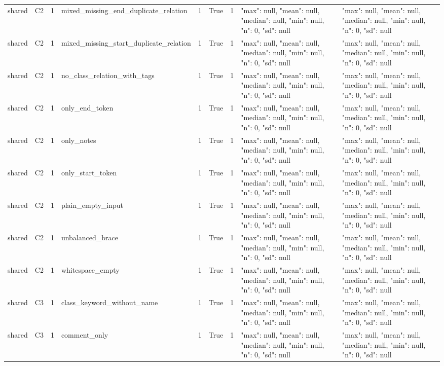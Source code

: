 \begin{tabular}{lllllllll}
shared & C2 & 1 & mixed\_missing\_end\_duplicate\_relation & 1 & True & 1 & {"max": null, "mean": null, "median": null, "min": null, "n": 0, "sd": null} & {"max": null, "mean": null, "median": null, "min": null, "n": 0, "sd": null} \\
shared & C2 & 1 & mixed\_missing\_start\_duplicate\_relation & 1 & True & 1 & {"max": null, "mean": null, "median": null, "min": null, "n": 0, "sd": null} & {"max": null, "mean": null, "median": null, "min": null, "n": 0, "sd": null} \\
shared & C2 & 1 & no\_class\_relation\_with\_tags & 1 & True & 1 & {"max": null, "mean": null, "median": null, "min": null, "n": 0, "sd": null} & {"max": null, "mean": null, "median": null, "min": null, "n": 0, "sd": null} \\
shared & C2 & 1 & only\_end\_token & 1 & True & 1 & {"max": null, "mean": null, "median": null, "min": null, "n": 0, "sd": null} & {"max": null, "mean": null, "median": null, "min": null, "n": 0, "sd": null} \\
shared & C2 & 1 & only\_notes & 1 & True & 1 & {"max": null, "mean": null, "median": null, "min": null, "n": 0, "sd": null} & {"max": null, "mean": null, "median": null, "min": null, "n": 0, "sd": null} \\
shared & C2 & 1 & only\_start\_token & 1 & True & 1 & {"max": null, "mean": null, "median": null, "min": null, "n": 0, "sd": null} & {"max": null, "mean": null, "median": null, "min": null, "n": 0, "sd": null} \\
shared & C2 & 1 & plain\_empty\_input & 1 & True & 1 & {"max": null, "mean": null, "median": null, "min": null, "n": 0, "sd": null} & {"max": null, "mean": null, "median": null, "min": null, "n": 0, "sd": null} \\
shared & C2 & 1 & unbalanced\_brace & 1 & True & 1 & {"max": null, "mean": null, "median": null, "min": null, "n": 0, "sd": null} & {"max": null, "mean": null, "median": null, "min": null, "n": 0, "sd": null} \\
shared & C2 & 1 & whitespace\_empty & 1 & True & 1 & {"max": null, "mean": null, "median": null, "min": null, "n": 0, "sd": null} & {"max": null, "mean": null, "median": null, "min": null, "n": 0, "sd": null} \\
shared & C3 & 1 & class\_keyword\_without\_name & 1 & True & 1 & {"max": null, "mean": null, "median": null, "min": null, "n": 0, "sd": null} & {"max": null, "mean": null, "median": null, "min": null, "n": 0, "sd": null} \\
shared & C3 & 1 & comment\_only & 1 & True & 1 & {"max": null, "mean": null, "median": null, "min": null, "n": 0, "sd": null} & {"max": null, "mean": null, "median": null, "min": null, "n": 0, "sd": null} \\

\end{tabular}
